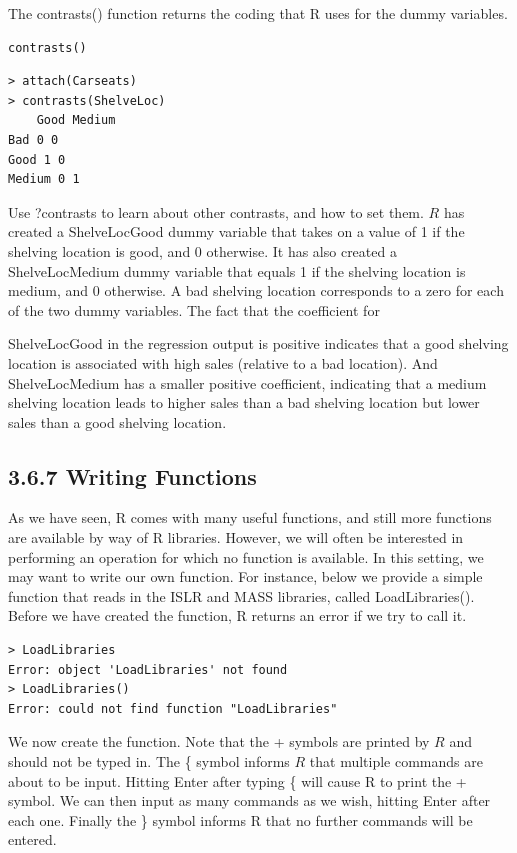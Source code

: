 \documentclass[10pt]{article}
\begin{document}
The contrasts() function returns the coding that R uses for the dummy variables.

\begin{verbatim}
contrasts()
\end{verbatim}

\begin{verbatim}
> attach(Carseats)
> contrasts(ShelveLoc)
    Good Medium
Bad 0 0
Good 1 0
Medium 0 1
\end{verbatim}

Use ?contrasts to learn about other contrasts, and how to set them. $R$ has created a ShelveLocGood dummy variable that takes on a value of 1 if the shelving location is good, and 0 otherwise. It has also created a ShelveLocMedium dummy variable that equals 1 if the shelving location is medium, and 0 otherwise. A bad shelving location corresponds to a zero for each of the two dummy variables. The fact that the coefficient for

ShelveLocGood in the regression output is positive indicates that a good shelving location is associated with high sales (relative to a bad location). And ShelveLocMedium has a smaller positive coefficient, indicating that a medium shelving location leads to higher sales than a bad shelving location but lower sales than a good shelving location.

\subsection*{3.6.7 Writing Functions}
As we have seen, R comes with many useful functions, and still more functions are available by way of R libraries. However, we will often be interested in performing an operation for which no function is available. In this setting, we may want to write our own function. For instance, below we provide a simple function that reads in the ISLR and MASS libraries, called LoadLibraries(). Before we have created the function, R returns an error if we try to call it.

\begin{verbatim}
> LoadLibraries
Error: object 'LoadLibraries' not found
> LoadLibraries()
Error: could not find function "LoadLibraries"
\end{verbatim}

We now create the function. Note that the + symbols are printed by $R$ and should not be typed in. The \{ symbol informs $R$ that multiple commands are about to be input. Hitting Enter after typing \{ will cause R to print the + symbol. We can then input as many commands as we wish, hitting Enter after each one. Finally the \} symbol informs R that no further commands will be entered.
\end{document}
